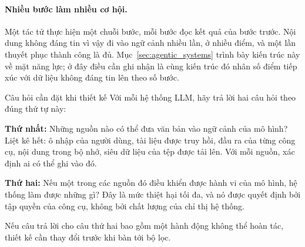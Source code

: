 \paragraph{Nhiều bước làm nhiều cơ hội.} Một tác tử thực hiện một chuỗi bước, mỗi bước đọc kết quả của bước trước. Nội dung không đáng tin vì vậy đi vào ngữ cảnh nhiều lần, ở nhiều điểm, và một lần thuyết phục thành công là đủ. Mục~\ref{sec:agentic_systems} trình bày kiến trúc này về mặt năng lực; ở đây điều cần ghi nhận là cùng kiến trúc đó nhân số điểm tiếp xúc với dữ liệu không đáng tin lên theo số bước.

\begin{pitfall}{Câu hỏi cần đặt khi thiết kế}
Với mỗi hệ thống LLM, hãy trả lời hai câu hỏi theo đúng thứ tự này:

\textbf{Thứ nhất:} Những nguồn nào có thể đưa văn bản vào ngữ cảnh của mô hình? Liệt kê hết: ô nhập của người dùng, tài liệu được truy hồi, đầu ra của từng công cụ, nội dung trong bộ nhớ, siêu dữ liệu của tệp được tải lên. Với mỗi nguồn, xác định ai có thể ghi vào đó.

\textbf{Thứ hai:} Nếu một trong các nguồn đó điều khiển được hành vi của mô hình, hệ thống làm được những gì? Đây là mức thiệt hại tối đa, và nó được quyết định bởi tập quyền của công cụ, không bởi chất lượng của chỉ thị hệ thống.

Nếu câu trả lời cho câu thứ hai bao gồm một hành động không thể hoàn tác, thiết kế cần thay đổi trước khi bàn tới bộ lọc.
\end{pitfall}
